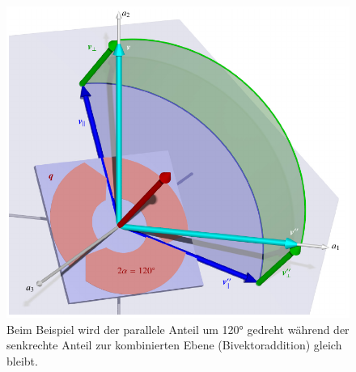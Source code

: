 \begin{figure}
	\centering
	\includegraphics{papers/clifford/3d/drehung.pdf}
	\caption{Beim Beispiel wird der parallele Anteil um 120° gedreht während der senkrechte Anteil zur kombinierten Ebene (Bivektoraddition) gleich bleibt.}
	\label{BildQuaternionBeispiel2}
\end{figure}

